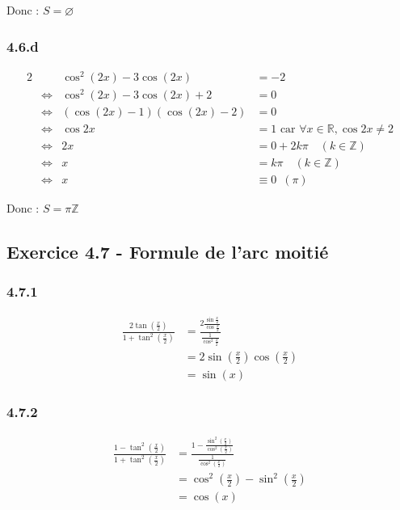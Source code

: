 \documentclass[a4paper,10pt]{report}
\begin{document}
Donc : $S = \varnothing$

\subsubsection*{4.6.d}
\begin{alignat*}{2}
	&                    &        \cos^2(2x) -3\cos(2x) &= -2 \\
	&\Longleftrightarrow &    \cos^2(2x) -3\cos(2x) + 2 &= 0  \\
	&\Longleftrightarrow & (\cos(2x) - 1)(\cos(2x) - 2) &= 0  \\
	&\Longleftrightarrow &                      \cos 2x &= 1  \text{ car } \forall x \in \mathbb{R}, \cos 2x \neq 2\\
	&\Longleftrightarrow &                           2x &= 0 + 2k\pi \quad (k \in \mathbb{Z}) \\
	&\Longleftrightarrow &                           x  &= k\pi \quad (k \in \mathbb{Z}) \\	
	&\Longleftrightarrow &                            x &\equiv 0 \enspace \left( \pi \right)
\end{alignat*}

Donc : $S =  \pi\mathbb{Z}$

\subsection*{Exercice 4.7 - Formule de l'arc moitié}

\subsubsection*{4.7.1}
\begin{equation*}
	\begin{split}
		\frac{2 \tan(\frac{x}{2})}{1 + \tan^2(\frac{x}{2})} 
			&= \frac{2\frac{\sin\frac{x}{2}}{\cos \frac{x}{2}}}{\frac{1}{\cos^2 \frac{x}{2}}} \\
			&= 2 \sin(\frac{x}{2})\cos(\frac{x}{2}) \\
			&= \sin(x)
	\end{split}
\end{equation*}

\subsubsection*{4.7.2}
\begin{equation*}
	\begin{split}
		\frac{1 - \tan^2(\frac{x}{2})}{1 + \tan^2(\frac{x}{2})} 
		&= \frac{1 - \frac{\sin^2(\frac{x}{2})}{\cos^2(\frac{x}{2})}}{\frac{1}{\cos^2(\frac{x}{2})}} \\
		&= \cos^2(\frac{x}{2}) - \sin^2(\frac{x}{2}) \\
		&= \cos(x)
	\end{split}
\end{equation*}
\end{document}
